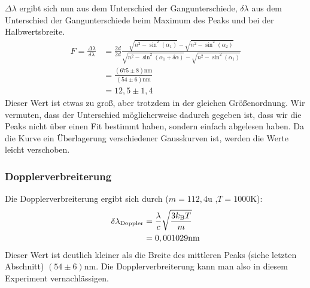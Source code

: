 $\Delta \lambda$ ergibt sich nun aus dem Unterschied der Gangunterschiede, $\delta \lambda$ aus dem Unterschied der Gangunterschiede beim Maximum des Peaks und bei der Halbwertsbreite.
\begin{align*}
F = \frac{\Delta \lambda}{\delta \lambda} &= \frac{2d}{2d}\frac{\sqrt{n^2-\sin^2(\alpha_1)}-\sqrt{n^2-\sin^2(\alpha_2)}}{\sqrt{n^2-\sin^2(\alpha_1+\delta \alpha)}-\sqrt{n^2-\sin^2(\alpha_1)}}\\
	&= \frac{(675 \pm 8) \si{\nano\meter}}{(54 \pm 6) \si{\nano\meter}}\\
	&=12,5 \pm 1,4
\end{align*}
Dieser Wert ist etwas zu groß, aber trotzdem in der gleichen Größenordnung. Wir vermuten, dass der Unterschied möglicherweise dadurch gegeben ist, dass wir die Peaks nicht über einen Fit bestimmt haben, sondern einfach abgelesen haben. Da die Kurve ein Überlagerung verschiedener Gausskurven ist, werden die Werte leicht verschoben.

\subsubsection{Dopplerverbreiterung}
Die Dopplerverbreiterung ergibt sich durch ($m = 112,4\si{\atomicmassunit}$ \cite{wiki_cd},$ T = 1000\si{\kelvin}$):
\begin{align*}
\delta \lambda_\mathrm{Doppler} &= \frac{\lambda}{c}\sqrt{\frac{3k_\mathrm{B}T}{m}}\\
&= 0,001029 \si{\nano\meter}
\end{align*}
Dieser Wert ist deutlich kleiner als die Breite des mittleren Peaks (siehe letzten Abschnitt) $(54 \pm 6) \si{\nano\meter}$. Die Dopplerverbreiterung kann man also in diesem Experiment vernachlässigen.


